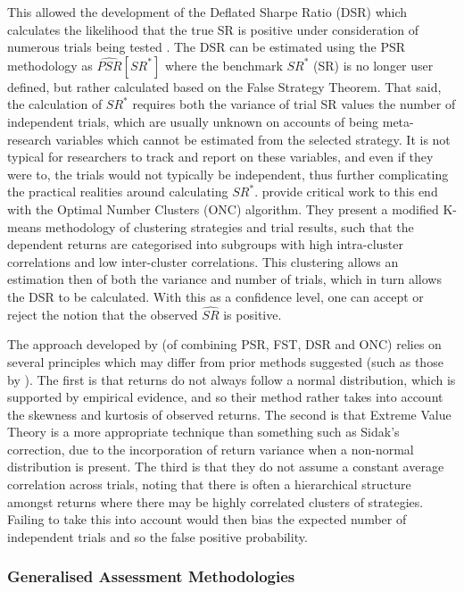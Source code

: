 \documentclass[a4paper,11pt,oneside]{article}
\theoremstyle{plain}
\theoremstyle{definition}
\begin{document}
	 This allowed the development of the Deflated Sharpe Ratio (DSR) which calculates the likelihood that the true SR is positive under consideration of numerous trials being tested \citep{BaileySharpe}. The DSR can be estimated using the PSR methodology as $\widehat{PSR}[SR^*]$ where the benchmark $SR^{*}$ (SR) is no longer user defined, but rather calculated based on the False Strategy Theorem. That said, the calculation of $SR^{*}$ requires both the variance of trial SR values the number of independent trials, which are usually unknown on accounts of being meta-research variables which cannot be estimated from the selected strategy. It is not typical for researchers to track and report on these variables, and even if they were to, the trials would not typically be independent, thus further complicating the practical realities around calculating $SR^{*}$. \citet{PradoDSR} provide critical work to this end with the Optimal Number Clusters (ONC) algorithm. They present a modified K-means methodology of clustering strategies and trial results, such that the dependent returns are categorised into subgroups with high intra-cluster correlations and low inter-cluster correlations. This clustering allows an estimation then of both the variance and number of trials, which in turn allows the DSR to be calculated. With this as a confidence level, one can accept or reject the notion that the observed $\widehat{SR}$ is positive.
		\hfill \break 
		
	The approach developed by \citet{PradoDSR} (of combining PSR, FST, DSR and ONC) relies on several principles which may differ from prior methods suggested (such as those by \citet{Harvey}). The first is that returns do not always follow a normal distribution, which is supported by empirical evidence, and so their method rather takes into account the skewness and kurtosis of observed returns. The second is that Extreme Value Theory is a more appropriate technique than something such as Sidak's correction, due to the incorporation of return variance when a non-normal distribution is present. The third is that they do not assume a  constant average correlation across trials, noting that there is often a hierarchical structure amongst returns where there may be highly correlated clusters of strategies. Failing to take this into account would then bias the expected number of independent trials and so the false positive probability. 

	\subsubsection{Generalised Assessment Methodologies}\label{lr_backtest_cscv}
	
\end{document}
